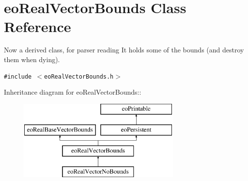 \section{eo\-Real\-Vector\-Bounds Class Reference}
\label{classeo_real_vector_bounds}
Now a derived class, for parser reading It holds some of the bounds (and destroy them when dying).  


{\tt \#include $<$eo\-Real\-Vector\-Bounds.h$>$}

Inheritance diagram for eo\-Real\-Vector\-Bounds::\begin{figure}[H]
\begin{center}
\leavevmode
\includegraphics[height=4cm]{classeo_real_vector_bounds}
\end{center}
\end{figure}
